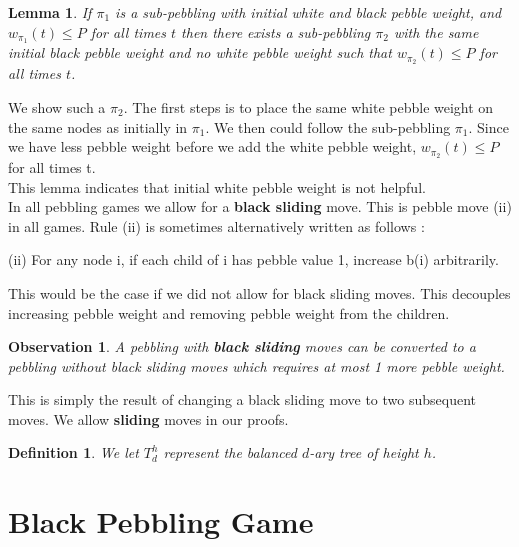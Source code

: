 \documentclass[12pt]{article}
\newenvironment{proofL}{\hspace{.4em}}
                      {\hspace{\fill}{$\blacksquare$} \smallskip}
\newtheorem{lemma}[theorem]{Lemma}
\newtheorem{obs}[theorem]{Observation}
\newtheorem{definition}[theorem]{Definition}
\begin{document}
\begin{lemma}
If $\pi_1$ is a sub-pebbling with initial white and black pebble weight, and $w_{\pi_1}(t) \leq P$ for all times $t$ then there exists a sub-pebbling $\pi_2$ with the same initial black pebble weight and no white pebble weight such that $w_{\pi_2}(t) \leq P$ for all times $t$.
\end{lemma}

\begin{proofL}
We show such a $\pi_2$. The first steps is to place the same white pebble weight on the same nodes as initially in $\pi_1$. We then could follow the sub-pebbling $\pi_1$. Since we have less pebble weight before we add the white pebble weight, $w_{\pi_2}(t) \leq P$ for all times t.
\end{proofL}\\

This lemma indicates that initial white pebble weight is not helpful.\\

In all pebbling games we allow for a {\bf black sliding} move. This is pebble move (ii) in all games. Rule (ii) is sometimes alternatively written as follows :

\noindent
(ii) For any node i, if each child of i has pebble value 1, increase b(i) arbitrarily.

This would be the case if we did not allow for black sliding moves. This decouples increasing pebble weight and removing pebble weight from the children.


\begin{obs}
A pebbling with {\bf black sliding} moves can be converted to a pebbling without black sliding moves which requires at most 1 more pebble weight.
\end{obs}


This is simply the result of changing a black sliding move to two subsequent moves. We allow {\bf sliding} moves in our proofs.


\begin{definition}
We let $T^h_d$ represent the balanced $d$-ary tree of height $h$.
\end{definition}

\newpage	









\section{Black Pebbling Game} 
\end{document}
